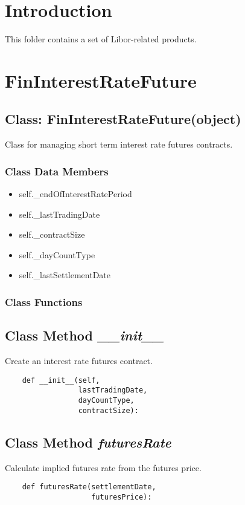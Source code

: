 \documentclass[twoside,11pt]{book}
\begin{document}
\section{Introduction}
This folder contains a set of Libor-related products.
\newpage
\section{FinInterestRateFuture}

\subsection{Class: FinInterestRateFuture(object)}
Class for managing short term interest rate futures contracts. 

\subsubsection{Class Data Members}
\begin{itemize}
\item{self.\_endOfInterestRatePeriod}
\item{self.\_lastTradingDate}
\item{self.\_contractSize}
\item{self.\_dayCountType}
\item{self.\_lastSettlementDate}
\end{itemize}

\subsubsection{Class Functions}

\subsection{Class Method {\it \_\_init\_\_}}
Create an interest rate futures contract.

\begin{lstlisting}
    def __init__(self, 
                 lastTradingDate,
                 dayCountType,
                 contractSize):
\end{lstlisting}

\subsection{Class Method {\it futuresRate}}
Calculate implied futures rate from the futures price.

\begin{lstlisting}
    def futuresRate(settlementDate,
                    futuresPrice):
\end{lstlisting}
\end{document}
